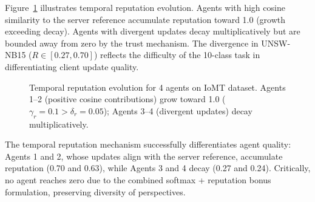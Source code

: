 \documentclass[conference]{IEEEtran}
\begin{document}
Figure~\ref{fig:trust} illustrates temporal reputation evolution. Agents with high cosine similarity to the server reference accumulate reputation toward 1.0 (growth exceeding decay). Agents with divergent updates decay multiplicatively but are bounded away from zero by the trust mechanism. The divergence in UNSW-NB15 ($R \in [0.27, 0.70]$) reflects the difficulty of the 10-class task in differentiating client update quality.

\begin{figure}[t]
\centering
{}
\caption{Temporal reputation evolution for 4 agents on IoMT dataset. Agents 1--2 (positive cosine contributions) grow toward 1.0 ($\gamma_r=0.1 > \delta_r=0.05$); Agents 3--4 (divergent updates) decay multiplicatively.}
\label{fig:trust}
\end{figure}

The temporal reputation mechanism successfully differentiates agent quality: Agents 1 and 2, whose updates align with the server reference, accumulate reputation (0.70 and 0.63), while Agents 3 and 4 decay (0.27 and 0.24). Critically, no agent reaches zero due to the combined softmax + reputation bonus formulation, preserving diversity of perspectives.
\end{document}
